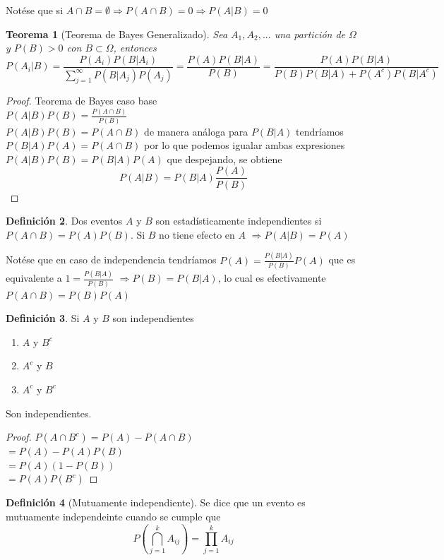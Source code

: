 \documentclass[11pt,a4paper,oneside]{report}
\theoremstyle{definition}
\newtheorem{definicion}{Definición}[chapter]
\theoremstyle{plain}
\newtheorem{teorema}[definicion]{Teorema}
\theoremstyle{remark}
\begin{document}
Notése que si $A\cap B = \emptyset \Rightarrow P(A\cap B)=0 \Rightarrow P(A|B)=0$

\begin{teorema}[Teorema de Bayes Generalizado]\label{thm:Bayes}
  Sea $A_{1},A_{2},...$ una partición de $\Omega$ y $P(B)>0$ con $B \subset \Omega$,
        entonces
            \[ P(A_{i}|B)=\frac{P(A_{i})P(B|A_{i})}{\sum_{j=1}^{\infty} P(B|A_{j})P(A_{j})}=\frac{P(A)P(B|A)}{P(B)}=\frac{P(A)P(B|A)}{P(B)P(B|A)+P(A^c)P(B|A^c)}\]
\end{teorema}

\begin{proof}
  Teorema de Bayes caso base\\
  $P(A|B)P(B)=\frac{P(A\cap B)}{P(B)}$\\
  $P(A|B)P(B)=P(A\cap B)$ de manera análoga para $P(B|A)$ tendríamos \\
  $P(B|A)P(A)=P(A\cap B)$ por lo que podemos igualar ambas expresiones\\
  $P(A|B)P(B)=P(B|A)P(A)$ que despejando, se obtiene
  \[ P(A|B)=P(B|A)\frac{P(A)}{P(B)}\]
\end{proof}

\begin{definicion}
  Dos eventos $A$ y $B$ son estadísticamente independientes si $P(A\cap B)=P(A)P(B)$.
  Si $B$ no tiene efecto en $A$ $\Rightarrow P(A|B)=P(A)$
\end{definicion}
Notése que en caso de independencia tendríamos $P(A)= \frac{P(B|A)}{P(B)}P(A)$ que es
equivalente a $1=\frac{P(B|A)}{P(B)}$ $\Rightarrow P(B)=P(B|A)$, lo cual es efectivamente 
$P(A \cap B)=P(B)P(A)$

\begin{definicion}
  Si $A$ y $B$ son independientes 
  \begin{enumerate}
    \item $A$ y $B^c$
    \item $A^{c}$ y $B$
    \item $A^{c}$ y $B^{c}$
  \end{enumerate}
  Son independientes.
\end{definicion}

\begin{proof}
  $P(A\cap B^{c})=P(A)-P(A\cap B)$\\
  $=P(A)-P(A)P(B)$\\
  $=P(A)(1-P(B))$\\
  $=P(A)P(B^c)$
\end{proof}

\begin{definicion}[Mutuamente independiente]
  Se dice que un evento es mutuamente independeinte cuando se cumple que 
  \[ P(\bigcap^k_{j=1}A_{ij})=\prod^{k}_{j=1}A_{ij} \]
\end{definicion}
\end{document}
